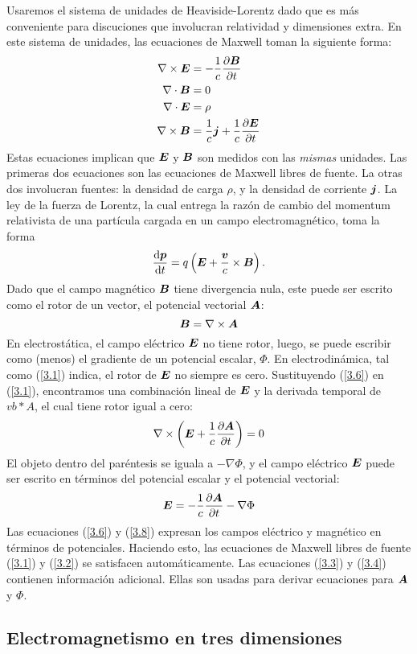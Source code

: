 Usaremos el sistema de unidades de Heaviside-Lorentz dado que es más conveniente para discuciones que involucran relatividad y dimensiones extra. En este sistema de unidades, las ecuaciones de Maxwell toman la siguiente forma:
\begin{align}
    \label{3.1}\nabla\times\vb*{E}&=-\frac{1}{c}\pdv{\vb*{B}}{t}\\
    \label{3.2}\nabla\cdot\vb*{B}&=0\\
    \label{3.3}\nabla\cdot\vb*{E}&=\rho\\
    \label{3.4}\nabla\times\vb*{B}&=\frac{1}{c}\vb*{j}+\frac{1}{c}\pdv{\vb*{E}}{t}
\end{align}
Estas ecuaciones implican que $\vb*{E}$ y $\vb*{B}$ son medidos con las \textit{mismas} unidades. Las primeras dos ecuaciones son las ecuaciones de Maxwell libres de fuente. La otras dos involucran fuentes: la densidad de carga $\rho$, y la densidad de corriente $\vb*{j}$. La ley de la fuerza de Lorentz, la cual entrega la razón de cambio del momentum relativista de una partícula cargada en un campo electromagnético, toma la forma
\begin{equation}
    \dv{\vb*{p}}{t}=q\left(\vb*{E}+\frac{\vb*{v}}{c}\times\vb*{B}\right).
\end{equation}
Dado que el campo magnético $\vb*{B}$ tiene divergencia nula, este puede ser escrito como el rotor de un vector, el potencial vectorial $\vb*{A}$:
\begin{equation}\label{3.6}
    \vb*{B}=\nabla\times \vb*{A}
\end{equation}
En electrostática, el campo eléctrico $\vb*{E}$ no tiene rotor, luego, se puede escribir como (menos) el gradiente de un potencial escalar, $\Phi$. En electrodinámica, tal como (\ref{3.1}) indica, el rotor de $\vb*{E}$ no siempre es cero. Sustituyendo (\ref{3.6}) en (\ref{3.1}), encontramos una combinación lineal de $\vb*{E}$ y la derivada temporal de $vb*{A}$, el cual tiene rotor igual a cero:
\begin{equation}
    \nabla\times\left(\vb*{E}+\frac{1}{c}\pdv{\vb*{A}}{t}\right)=0
\end{equation}
El objeto dentro del paréntesis se iguala a $-\nabla\Phi$, y el campo eléctrico $\vb*{E}$ puede ser escrito en términos del potencial escalar y el potencial vectorial:
\begin{equation}\label{3.8}
    \vb*{E}=-\frac{1}{c}\pdv{\vb*{A}}{t}-\nabla\Phi
\end{equation}
Las ecuaciones (\ref{3.6}) y (\ref{3.8}) expresan los campos eléctrico y magnético en términos de potenciales. Haciendo esto, las ecuaciones de Maxwell libres de fuente (\ref{3.1}) y (\ref{3.2}) se satisfacen automáticamente. Las ecuaciones (\ref{3.3}) y (\ref{3.4}) contienen información adicional. Ellas son usadas para derivar ecuaciones para $\vb*{A}$ y $\Phi$.

\subsection{Electromagnetismo en tres dimensiones}